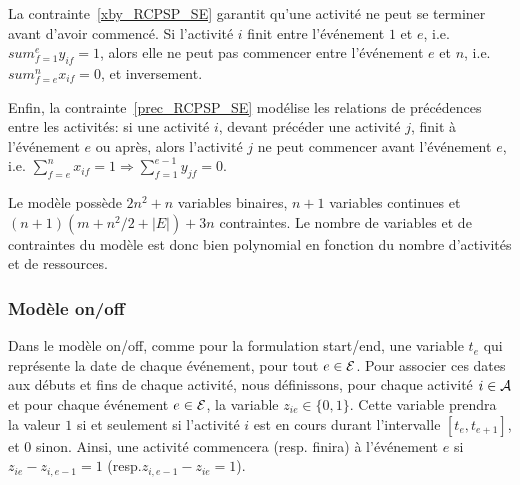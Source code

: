 La contrainte~\eqref{xby_RCPSP_SE} garantit qu'une activité ne peut se
terminer avant d'avoir commencé. Si l'activité $i$ finit entre
l'événement $1$ et $e$, i.e. $sum_{f=1}^{e} y_{if}=1$, alors elle ne
peut pas commencer entre l'événement $e$ et $n$, i.e. $sum_{f=e}^{n}
x_{if}=0$, et inversement.

Enfin, la contrainte~\eqref{prec_RCPSP_SE} modélise les relations
de précédences entre les activités: si une activité $i$, devant
précéder une activité $j$, finit à l'événement $e$ ou après, alors
l'activité $j$ ne peut commencer avant l'événement $e$, i.e.
$\sum_{f=e}^n x_{if}=1 \Rightarrow \sum_{f=1}^{e-1} y_{jf}=0$.

Le modèle possède $2n^2+n$ variables binaires, $n+1$ variables
continues et $(n+1)(m+n^2/2+|E|)+3n$ contraintes. Le nombre de
variables et de contraintes du modèle est donc bien polynomial en
fonction du nombre d'activités et de ressources.
 
\subsubsection{Modèle on/off} 

Dans le modèle on/off, comme pour la
formulation start/end, une variable $t_e$ qui représente la date
de chaque événement, pour tout $e \in {\cal E}$. Pour associer ces
dates aux débuts et fins de chaque activité, nous définissons, pour
chaque activité $i \in {\cal A}$ et pour chaque événement $e \in {\cal E}$, la
variable $z_{ie} \in \{0,1\}$. Cette variable prendra la valeur
$1$ si et seulement si l'activité $i$ est en cours durant
l'intervalle $[t_e,t_{e+1}]$, et 0 sinon. Ainsi, une activité
commencera (resp. finira) à l'événement $e$ si
$z_{ie}-z_{i,e-1}=1$ (resp.$z_{i,e-1}-z_{ie}=1$).

